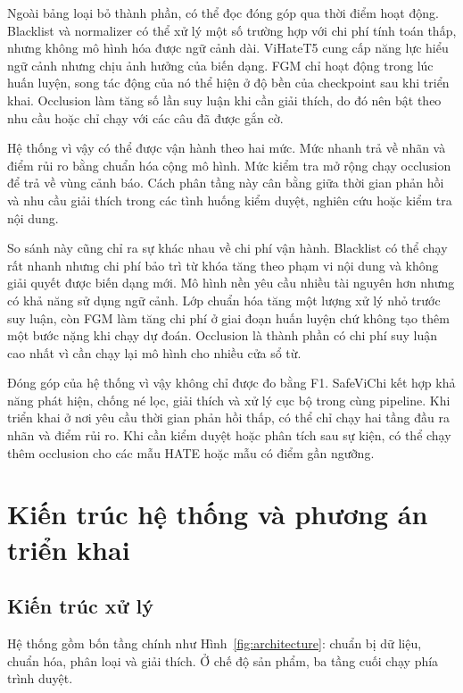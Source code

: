\documentclass[12pt,a4paper]{article}
\begin{document}
Ngoài bảng loại bỏ thành phần, có thể đọc đóng góp qua thời điểm hoạt động. Blacklist và normalizer có thể xử lý một số trường hợp với chi phí tính toán thấp, nhưng không mô hình hóa được ngữ cảnh dài. ViHateT5 cung cấp năng lực hiểu ngữ cảnh nhưng chịu ảnh hưởng của biến dạng. FGM chỉ hoạt động trong lúc huấn luyện, song tác động của nó thể hiện ở độ bền của checkpoint sau khi triển khai. Occlusion làm tăng số lần suy luận khi cần giải thích, do đó nên bật theo nhu cầu hoặc chỉ chạy với các câu đã được gắn cờ.

Hệ thống vì vậy có thể được vận hành theo hai mức. Mức nhanh trả về nhãn và điểm rủi ro bằng chuẩn hóa cộng mô hình. Mức kiểm tra mở rộng chạy occlusion để trả về vùng cảnh báo. Cách phân tầng này cân bằng giữa thời gian phản hồi và nhu cầu giải thích trong các tình huống kiểm duyệt, nghiên cứu hoặc kiểm tra nội dung.

So sánh này cũng chỉ ra sự khác nhau về chi phí vận hành. Blacklist có thể chạy rất nhanh nhưng chi phí bảo trì từ khóa tăng theo phạm vi nội dung và không giải quyết được biến dạng mới. Mô hình nền yêu cầu nhiều tài nguyên hơn nhưng có khả năng sử dụng ngữ cảnh. Lớp chuẩn hóa tăng một lượng xử lý nhỏ trước suy luận, còn FGM làm tăng chi phí ở giai đoạn huấn luyện chứ không tạo thêm một bước nặng khi chạy dự đoán. Occlusion là thành phần có chi phí suy luận cao nhất vì cần chạy lại mô hình cho nhiều cửa sổ từ.

Đóng góp của hệ thống vì vậy không chỉ được đo bằng F1. SafeViChi kết hợp khả năng phát hiện, chống né lọc, giải thích và xử lý cục bộ trong cùng pipeline. Khi triển khai ở nơi yêu cầu thời gian phản hồi thấp, có thể chỉ chạy hai tầng đầu ra nhãn và điểm rủi ro. Khi cần kiểm duyệt hoặc phân tích sau sự kiện, có thể chạy thêm occlusion cho các mẫu HATE hoặc mẫu có điểm gần ngưỡng.

\section{Kiến trúc hệ thống và phương án triển khai}
\subsection{Kiến trúc xử lý}
Hệ thống gồm bốn tầng chính như Hình~\ref{fig:architecture}: chuẩn bị dữ liệu, chuẩn hóa, phân loại và giải thích. Ở chế độ sản phẩm, ba tầng cuối chạy phía trình duyệt.
\end{document}

